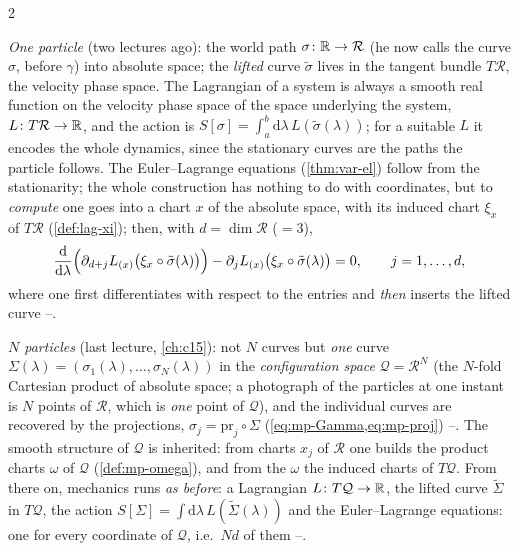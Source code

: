 \begin{paracol}{2}
\begin{recall}\label{rec:zw-recall}
\emph{One particle} (two lectures ago): the world path $\sigma\colon\mathbb{R}\to\mathcal R$ (he now calls the curve $\sigma$, before $\gamma$) into absolute space; the \emph{lifted} curve $\tilde\sigma$ lives in the tangent bundle $T\mathcal R$, the velocity phase space. The Lagrangian of a system is always a smooth real function on the velocity phase space of the space underlying the system, $L\colon T\mathcal R\to\mathbb{R}$, and the action is $S[\sigma]=\int_a^b\mathrm d\lambda\,L(\tilde\sigma(\lambda))$; for a suitable $L$ it encodes the whole dynamics, since the stationary curves are the paths the particle follows. The Euler--Lagrange equations (\cref{thm:var-el}) follow from the stationarity; the whole construction has nothing to do with coordinates, but to \emph{compute} one goes into a chart $x$ of the absolute space, with its induced chart $\xi_x$ of $T\mathcal R$ (\cref{def:lag-xi}); then, with $d=\dim\mathcal R$ ($=3$),
\[
  \frac{\mathrm d}{\mathrm d\lambda}\Bigl(\partial_{d+j}L_{(x)}\bigl(\xi_x\circ\tilde\sigma(\lambda)\bigr)\Bigr)-\partial_jL_{(x)}\bigl(\xi_x\circ\tilde\sigma(\lambda)\bigr)=0,\qquad j=1,\dots,d,
\]
where one first differentiates with respect to the entries and \emph{then} inserts the lifted curve --.

\emph{$N$ particles} (last lecture, \cref{ch:c15}): not $N$ curves but \emph{one} curve $\Sigma(\lambda)=(\sigma_1(\lambda),\dots,\sigma_N(\lambda))$ in the \emph{configuration space} $\mathcal Q=\mathcal R^N$ (the $N$-fold Cartesian product of absolute space; a photograph of the particles at one instant is $N$ points of $\mathcal R$, which is \emph{one} point of $\mathcal Q$), and the individual curves are recovered by the projections, $\sigma_j=\mathrm{pr}_j\circ\Sigma$ (\cref{eq:mp-Gamma,eq:mp-proj}) --. The smooth structure of $\mathcal Q$ is inherited: from charts $x_j$ of $\mathcal R$ one builds the product charts $\omega$ of $\mathcal Q$ (\cref{def:mp-omega}), and from the $\omega$ the induced charts of $T\mathcal Q$. From there on, mechanics runs \emph{as before}: a Lagrangian $L\colon T\mathcal Q\to\mathbb{R}$, the lifted curve $\tilde\Sigma$ in $T\mathcal Q$, the action $S[\Sigma]=\int\mathrm d\lambda\,L(\tilde\Sigma(\lambda))$ and the Euler--Lagrange equations: one for every coordinate of $\mathcal Q$, i.e.\ $Nd$ of them --.
\end{recall}


\end{paracol}
